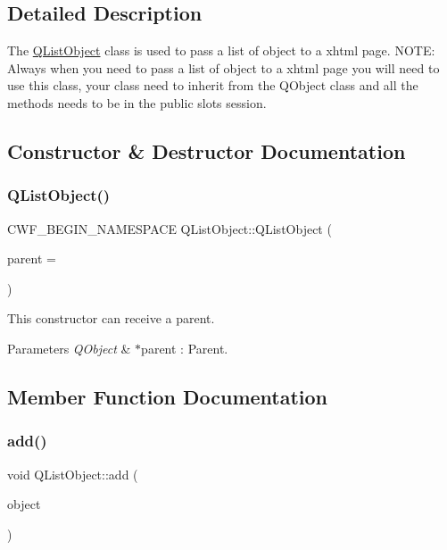 \subsection{Detailed Description}
The \mbox{\hyperlink{class_q_list_object}{Q\+List\+Object}} class is used to pass a list of object to a xhtml page. N\+O\+TE\+: Always when you need to pass a list of object to a xhtml page you will need to use this class, your class need to inherit from the Q\+Object class and all the methods needs to be in the public slots session. 

\subsection{Constructor \& Destructor Documentation}
\mbox{\label{class_q_list_object_a83076620d8a83ebb0d2b2a4a8bd84e38}} 
\subsubsection{\texorpdfstring{Q\+List\+Object()}{QListObject()}}
{\footnotesize\ttfamily C\+W\+F\+\_\+\+B\+E\+G\+I\+N\+\_\+\+N\+A\+M\+E\+S\+P\+A\+CE Q\+List\+Object\+::\+Q\+List\+Object (\begin{DoxyParamCaption}\item[{Q\+Object $\ast$}]{parent = {} }\end{DoxyParamCaption})\hspace{0.3cm}{\ttfamily [explicit]}}



This constructor can receive a parent. 


\begin{DoxyParams}{Parameters}
{\em Q\+Object} & $\ast$parent \+: Parent. \\
\hline
\end{DoxyParams}


\subsection{Member Function Documentation}
\mbox{\label{class_q_list_object_ad5e960eabd3e9b7d49228ea7549a9bd7}} 
\subsubsection{\texorpdfstring{add()}{add()}}
{\footnotesize\ttfamily void Q\+List\+Object\+::add (\begin{DoxyParamCaption}\item[{Q\+Object $\ast$}]{object }\end{DoxyParamCaption})}



